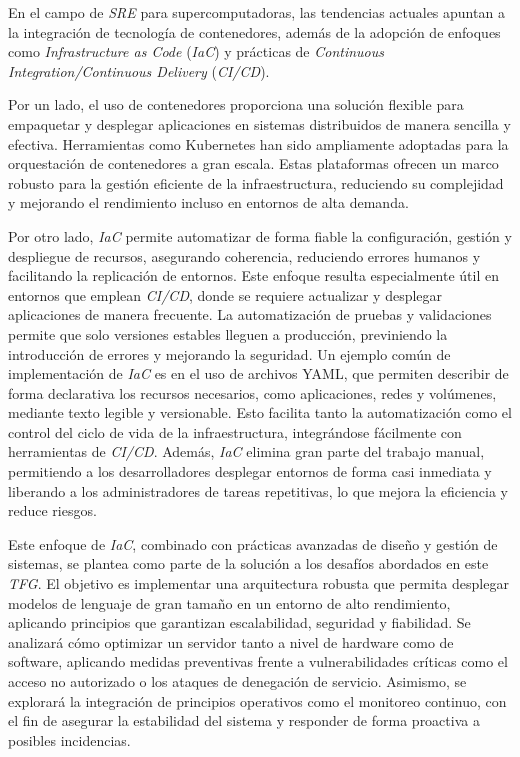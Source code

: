 En el campo de \textit{SRE} para supercomputadoras, las tendencias actuales apuntan a la integración de tecnología de contenedores, además de la adopción de enfoques como \textit{Infrastructure as Code} (\textit{IaC}) y prácticas de \textit{Continuous Integration/Continuous Delivery} (\textit{CI/CD}).

\newpage
Por un lado, el uso de contenedores proporciona una solución flexible para empaquetar y desplegar aplicaciones en sistemas distribuidos de manera sencilla y efectiva. Herramientas como Kubernetes \cite{ref8} han sido ampliamente adoptadas para la orquestación de contenedores a gran escala. Estas plataformas ofrecen un marco robusto para la gestión eficiente de la infraestructura, reduciendo su complejidad y mejorando el rendimiento incluso en entornos de alta demanda.

Por otro lado, \textit{IaC}  permite automatizar de forma fiable la configuración, gestión y despliegue de recursos, asegurando coherencia, reduciendo errores humanos y facilitando la replicación de entornos. Este enfoque resulta especialmente útil en entornos que emplean \textit{CI/CD}, donde se requiere actualizar y desplegar aplicaciones de manera frecuente. La automatización de pruebas y validaciones permite que solo versiones estables lleguen a producción, previniendo la introducción de errores y mejorando la seguridad. Un ejemplo común de implementación de \textit{IaC} es en el uso de archivos YAML, que permiten describir de forma declarativa los recursos necesarios, como aplicaciones, redes y volúmenes, mediante texto legible y versionable. Esto facilita tanto la automatización como el control del ciclo de vida de la infraestructura, integrándose fácilmente con herramientas de \textit{CI/CD}. Además, \textit{IaC} elimina gran parte del trabajo manual, permitiendo a los desarrolladores desplegar entornos de forma casi inmediata y liberando a los administradores de tareas repetitivas, lo que mejora la eficiencia y reduce riesgos.

Este enfoque de \textit{IaC}, combinado con prácticas avanzadas de diseño y gestión de sistemas, se plantea como parte de la solución a los desafíos abordados en este \textit{TFG}. El objetivo es implementar una arquitectura robusta que permita desplegar modelos de lenguaje de gran tamaño en un entorno de alto rendimiento, aplicando principios que garantizan escalabilidad, seguridad y fiabilidad. Se analizará cómo optimizar un servidor tanto a nivel de hardware como de software, aplicando medidas preventivas frente a vulnerabilidades críticas como el acceso no autorizado o los ataques de denegación de servicio. Asimismo, se explorará la integración de principios operativos como el monitoreo continuo, con el fin de asegurar la estabilidad del sistema y responder de forma proactiva a posibles incidencias.

